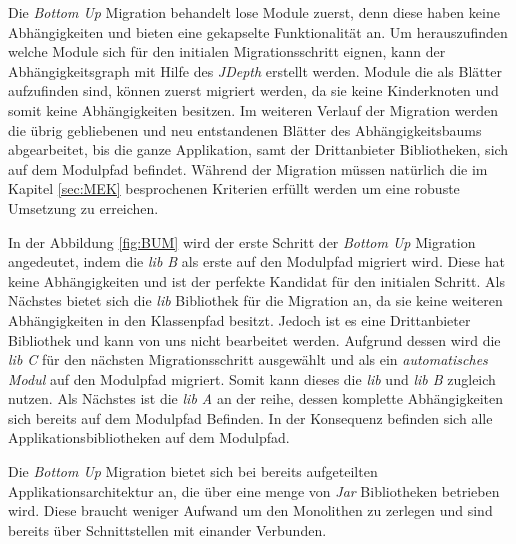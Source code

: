 	Die \textit{Bottom Up} Migration behandelt lose Module zuerst, denn diese haben keine Abhängigkeiten und bieten eine gekapselte Funktionalität an. Um herauszufinden welche Module sich für den initialen Migrationsschritt eignen, kann der Abhängigkeitsgraph mit Hilfe des \textit{JDepth} erstellt werden. Module die als Blätter aufzufinden sind, können zuerst migriert werden, da sie keine Kinderknoten und somit keine Abhängigkeiten besitzen. Im weiteren Verlauf der Migration werden die übrig gebliebenen und neu entstandenen Blätter des Abhängigkeitsbaums abgearbeitet, bis die ganze Applikation, samt der Drittanbieter Bibliotheken, sich auf dem Modulpfad befindet. Während der Migration müssen natürlich die im Kapitel \ref{sec:MEK} besprochenen Kriterien erfüllt werden um eine robuste Umsetzung zu erreichen. \cite{javaMod9,modulProgJava9,java9modRevealed,modulMitJava9,masteringJava9} \bigbreak

	In der Abbildung \ref{fig:BUM} wird der erste Schritt der \textit{Bottom Up} Migration angedeutet, indem die \textit{lib B} als erste auf den Modulpfad migriert wird. Diese hat keine Abhängigkeiten und ist der perfekte Kandidat für den initialen Schritt. Als Nächstes bietet sich die \textit{lib} Bibliothek für die Migration an, da sie keine weiteren Abhängigkeiten in den Klassenpfad besitzt. Jedoch ist es eine Drittanbieter Bibliothek und kann von uns nicht bearbeitet werden. Aufgrund dessen wird die \textit{lib C} für  den nächsten Migrationsschritt ausgewählt und als ein \textit{automatisches Modul} auf den Modulpfad migriert. Somit kann dieses die \textit{lib} und \textit{lib B} zugleich nutzen. Als Nächstes ist die \textit{lib A} an der reihe, dessen komplette Abhängigkeiten sich bereits auf dem Modulpfad Befinden. In der Konsequenz befinden sich alle Applikationsbibliotheken auf dem Modulpfad. \cite{javaMod9,modulProgJava9,java9modRevealed,modulMitJava9,masteringJava9} \bigbreak

	Die \textit{Bottom Up} Migration bietet sich bei bereits aufgeteilten Applikationsarchitektur an, die über eine menge von \textit{Jar} Bibliotheken betrieben wird. Diese braucht weniger Aufwand um den Monolithen zu zerlegen und sind bereits über Schnittstellen mit einander Verbunden. \cite{modulProgJava9,modulMitJava9}









